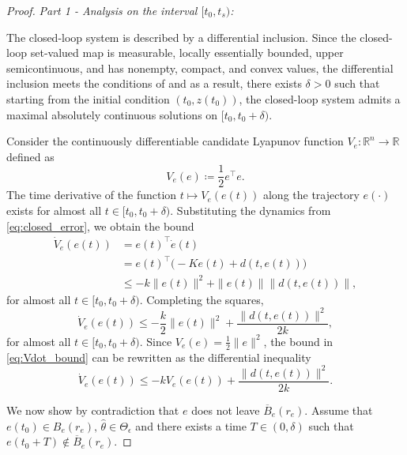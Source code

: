 \documentclass[conference]{ieeeconf}
\begin{document}
\begin{proof}
\textit{Part 1 - Analysis on the interval $[t_0, t_{s})$:}

 The closed-loop system is described by a differential inclusion. Since the closed-loop set-valued map is measurable, locally essentially bounded, upper semicontinuous, and has nonempty, compact, and convex values, the differential inclusion meets the conditions of \cite[Chap.~2, Thm.~1]{SCC.Aubin.Cellina1984} and as a result, there exists $\delta > 0$ such that starting from the initial condition $(t_0,z(t_0))$, the closed-loop system admits a maximal absolutely continuous solutions on $[t_0,t_0+\delta)$.

Consider the continuously differentiable candidate Lyapunov  function $V_{e}: \mathbb{R}^{n} \to \mathbb{R}$ defined as
\begin{equation}
    V_e(e) \coloneqq \frac{1}{2}e^\top e.
\end{equation}
 The time derivative of the function $t \mapsto V_e(e(t))$ along the trajectory $e(\cdot)$ exists for almost all $t \in [t_0, t_0+\delta)$. Substituting the dynamics from \eqref{eq:closed_error}, we obtain the bound
\begin{align}
\dot{V}_e(e(t)) &= e(t)^\top \dot{e}(t) \nonumber \\
&= e(t)^\top \big(-Ke(t) + d(t,e(t))\big) \nonumber \\
&\le -k\|e(t)\|^2 + \|e(t)\| \|d(t,e(t))\|,
\end{align}
for almost all $t \in [t_0, t_0+\delta)$. Completing the squares,
\begin{equation}
\dot{V}_e(e(t)) \le -\frac{k}{2}\|e(t)\|^2 + \frac{\|d(t,e(t))\|^2}{2k}, \label{eq:Vdot_bound}
\end{equation}
 for almost all $t \in [t_0, t_0+\delta)$.  Since $V_e(e) = \frac{1}{2}\|e\|^2$, the bound in \eqref{eq:Vdot_bound} can be rewritten as the differential inequality
\begin{equation}\label{eq:diff_ineq}
\dot{V}_e(e(t)) \le -k V_e(e(t)) + \frac{\|d(t,e(t))\|^2}{2k}.
\end{equation}

We now show by contradiction that $e$ does not leave $\overline B_e(r_e)$. Assume that $e(t_0) \in B_e(r_e),\, \hat \theta \in \Theta_\epsilon$ and there exists a time $T \in (0, \delta)$ such that $e(t_0+T) \notin \overline{B}_e(r_e)$. 


\end{proof}
\end{document}
